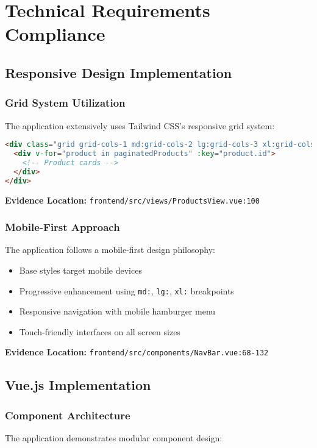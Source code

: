 \documentclass[12pt,a4paper]{article}
\begin{document}
\section{Technical Requirements Compliance}

\subsection{Responsive Design Implementation}

\subsubsection{Grid System Utilization}
The application extensively uses Tailwind CSS's responsive grid system:

\begin{lstlisting}[language=html, caption=Products Grid Implementation]
<div class="grid grid-cols-1 md:grid-cols-2 lg:grid-cols-3 xl:grid-cols-4 gap-6">
  <div v-for="product in paginatedProducts" :key="product.id">
    <!-- Product cards -->
  </div>
</div>
\end{lstlisting}

\textbf{Evidence Location:} \texttt{frontend/src/views/ProductsView.vue:100}

\subsubsection{Mobile-First Approach}
The application follows a mobile-first design philosophy:
\begin{itemize}
    \item Base styles target mobile devices
    \item Progressive enhancement using \texttt{md:}, \texttt{lg:}, \texttt{xl:} breakpoints
    \item Responsive navigation with mobile hamburger menu
    \item Touch-friendly interfaces on all screen sizes
\end{itemize}

\textbf{Evidence Location:} \texttt{frontend/src/components/NavBar.vue:68-132}

\subsection{Vue.js Implementation}

\subsubsection{Component Architecture}
The application demonstrates modular component design:
\end{document}
